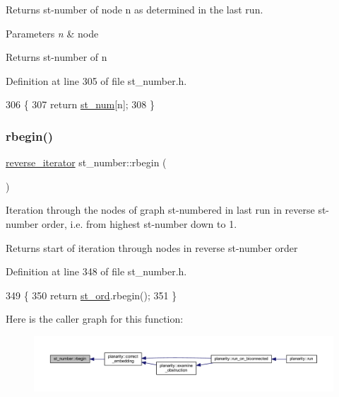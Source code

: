 Returns st-\/number of node {\ttfamily n} as determined in the last run. 


\begin{DoxyParams}{Parameters}
{\em n} & node\\
\hline
\end{DoxyParams}
\begin{DoxyReturn}{Returns}
st-\/number of {\ttfamily n} 
\end{DoxyReturn}


Definition at line 305 of file st\+\_\+number.\+h.


\begin{DoxyCode}
306     \{
307     \textcolor{keywordflow}{return} \mbox{\hyperlink{classst__number_ac3443aa6c9d11b990357d8ac1342cabc}{st\_num}}[n];
308     \}
\end{DoxyCode}
\mbox{\label{classst__number_a56f2c67e9b49362947fe0c99278f6d31}} 
\subsubsection{\texorpdfstring{rbegin()}{rbegin()}}
{\footnotesize\ttfamily \mbox{\hyperlink{classst__number_a7db0e7ac82d781b75e1712c1fe5c055e}{reverse\+\_\+iterator}} st\+\_\+number\+::rbegin (\begin{DoxyParamCaption}{ }\end{DoxyParamCaption})\hspace{0.3cm}{\ttfamily [inline]}}



Iteration through the nodes of graph st-\/numbered in last run in reverse st-\/number order, i.\+e. from highest st-\/number down to 1. 

\begin{DoxyReturn}{Returns}
start of iteration through nodes in reverse st-\/number order 
\end{DoxyReturn}


Definition at line 348 of file st\+\_\+number.\+h.


\begin{DoxyCode}
349     \{
350     \textcolor{keywordflow}{return} \mbox{\hyperlink{classst__number_af2160b5e111fe3730b4f9f3f3d09f98f}{st\_ord}}.rbegin();
351     \}
\end{DoxyCode}
Here is the caller graph for this function\+:\nopagebreak
\begin{figure}[H]
\begin{center}
\leavevmode
\includegraphics[width=350pt]{classst__number_a56f2c67e9b49362947fe0c99278f6d31_icgraph}
\end{center}
\end{figure}
\mbox{\label{classst__number_a4c5fdce6ab2be7ee9ddbb09e8d5c8560}} 
